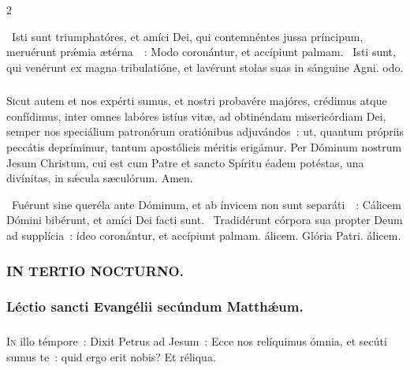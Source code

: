\documentclass[9pt,twoside]{extarticle}
\begin{document}
\begin{multicols}{2}
{{\begin{tightlist}{}
\item {}~Isti sunt triumphatóres, et amíci Dei, qui contemnéntes jussa príncipum, meruérunt prǽmia ætérna~~: \textred{*} Modo coronántur, et accípiunt palmam. ~Isti sunt, qui venérunt ex magna tribulatióne, et lavérunt stolas suas in sánguine Agni. odo.
\end{tightlist}

\subsubsection*{\center {}}
\lettrine{S}icut autem et nos expérti sumus, et nostri probavére majóres, crédimus atque confídimus, inter omnes labóres istíus vitæ, ad obtinéndam misericórdiam Dei, semper nos speciálium patronórum oratiónibus adjuvándos~: ut, quantum própriis peccátis deprímimur, tantum apostólicis méritis erigámur. Per Dóminum nostrum Jesum Christum, cui est cum Patre et sancto Spíritu éadem potéstas, una divínitas, in sǽcula sæculórum. Amen.

\begin{tightlist}{}
\item {}~Fuérunt sine queréla ante Dóminum, et ab ínvicem non sunt separáti~~: \textred{*} Cálicem Dómini bibérunt, et amíci Dei facti sunt.
~Tradidérunt córpora sua propter Deum ad supplícia~: ídeo coronántur, et accípiunt palmam. álicem. Glória Patri. álicem.
\end{tightlist}

\subsubsection*{\center \textsc{IN TERTIO NOCTURNO.}}
\subsubsection*{\center Léctio sancti Evangélii secúndum Matthǽum.}
\subsubsection*{\center {}}
\lettrine{I}n illo témpore~: Dixit Petrus ad Jesum~: Ecce nos relíquimus ómnia, et secúti sumus te~: quid ergo erit nobis? Et réliqua.

}}
\end{multicols}
\end{document}
